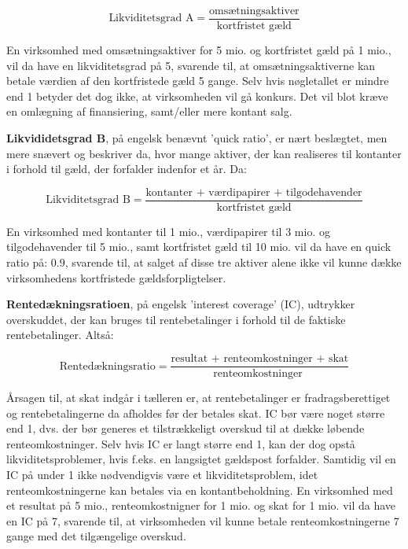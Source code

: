 \documentclass[10pt,reqno, usenames]{article}
\begin{document}
\begin{equation}
    \text{Likviditetsgrad A} =  \frac{\text{omsætningsaktiver}}{\text{kortfristet gæld}}
\end{equation}

En virksomhed med omsætningsaktiver for 5 mio. og kortfristet gæld på 1 mio., vil da have en likviditetsgrad på 5, svarende til, at omsætningsaktiverne kan betale værdien af den kortfristede gæld 5 gange. Selv hvis nøgletallet er mindre end 1 betyder det dog ikke, at virksomheden vil gå konkurs. Det vil blot kræve en omlægning af finansiering, samt/eller mere kontant salg. 

\vspace{10 pt}

\textbf{Likvididetsgrad B}, på engelsk benævnt 'quick ratio', er nært beslægtet, men mere snævert og beskriver da, hvor mange aktiver, der kan realiseres til kontanter i forhold til gæld, der forfalder indenfor et år. Da: 

\begin{equation}
    \text{Likviditetsgrad B} =  \frac{\text{kontanter + værdipapirer + tilgodehavender}}{\text{kortfristet gæld}}
\end{equation}

En virksomhed med kontanter til 1 mio., værdipapirer til 3 mio. og tilgodehavender til 5 mio., samt kortfristet gæld til 10 mio. vil da have en quick ratio på: 0.9, svarende til, at salget af disse tre aktiver alene ikke vil kunne dække virksomhedens kortfristede gældsforpligtelser. 

\vspace{10 pt}

\textbf{Rentedækningsratioen}, på engelsk 'interest coverage' (IC),  udtrykker overskuddet, der kan bruges til rentebetalinger i forhold til de faktiske rentebetalinger. Altså: 

\begin{equation}
    \text{Rentedækningsratio} =  \frac{\text{resultat + renteomkostninger + skat}}{\text{renteomkostninger }}
\end{equation}

Årsagen til, at skat indgår i tælleren er, at rentebetalinger er fradragsberettiget og rentebetalingerne da afholdes før der betales skat. IC bør være noget større end 1, dvs. der bør generes et tilstrækkeligt overskud til at dække løbende renteomkostninger. Selv hvis IC er langt større end 1, kan der dog opstå likviditetsproblemer, hvis f.eks. en langsigtet gældspost forfalder. Samtidig vil en IC på under 1 ikke nødvendigvis være et likviditetsproblem, idet renteomkostningerne kan betales via en kontantbeholdning. En virksomhed med et resultat på 5 mio., renteomkostnigner for 1 mio. og skat for 1 mio. vil da have en IC på 7, svarende til, at virksomheden vil kunne betale renteomkostningerne 7 gange med det tilgængelige overskud. 
\end{document}

